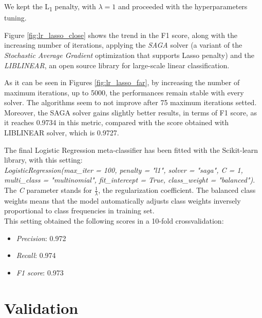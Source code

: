 We kept the L\textsubscript{1} penalty, with $ \lambda  = 1 $   and proceeded with the hyperparameters tuning.

Figure \ref{fig:lr_lasso_close} shows the trend in the F1 score, along with the increasing number of iterations, applying the \textit{SAGA}\cite{SAGA} solver (a variant of the \textit{Stochastic Average Gradient}\cite{SAG} optimization that supports Lasso penalty) and the \textit{LIBLINEAR}\cite{Liblinear}, an open source library for large-scale linear classification.

As it can be seen in Figures \ref{fig:lr_lasso_far}, by increasing the number of maximum iterations, up to 5000, the performances remain stable with every solver.
The algorithms seem to not improve after 75 maximum iterations setted.
Moreover, the SAGA solver gains slightly better results, in terms of F1 score, as it reaches 0.9734 in this metric, compared with the score obtained with LIBLINEAR solver, which is 0.9727.

The final Logistic Regression meta-classifier has been fitted with the Scikit-learn library, with this setting:\\
\textit{LogisticRegression(max\_iter = 100, penalty = "l1", solver = "saga", C = 1, multi\_class = "multinomial", fit\_intercept = True, class\_weight = "balanced")}.\\
The \textit{C} parameter stands for $ \frac{1}{\lambda} $, the regularization coefficient.
The balanced class weights means that the model automatically adjusts class weights inversely proportional to class frequencies in training set.\\
This setting obtained the following scores in a 10-fold crossvalidation:
\begin{itemize}
	\item[\PencilRight] \textit{Precision}: 0.972
	\item[\PencilRight] \textit{Recall}: 0.974
	\item[\PencilRight] \textit{F1 score}: 0.973
\end{itemize}
\section{Validation}